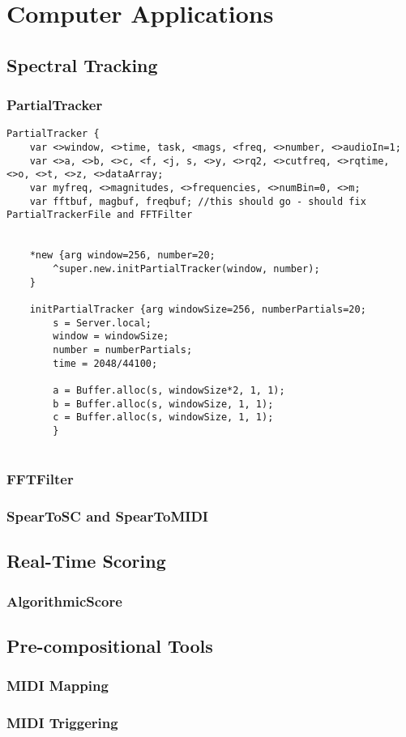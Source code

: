 \chapter{Computer Applications}

\section{Spectral Tracking}
\subsection{PartialTracker}

\begin{verbatim}
PartialTracker {
	var <>window, <>time, task, <mags, <freq, <>number, <>audioIn=1;
	var <>a, <>b, <>c, <f, <j, s, <>y, <>rq2, <>cutfreq, <>rqtime, <>o, <>t, <>z, <>dataArray;
	var myfreq, <>magnitudes, <>frequencies, <>numBin=0, <>m;
	var fftbuf, magbuf, freqbuf; //this should go - should fix PartialTrackerFile and FFTFilter

	
	*new {arg window=256, number=20;
		^super.new.initPartialTracker(window, number);
	}
	
	initPartialTracker {arg windowSize=256, numberPartials=20;
		s = Server.local;
		window = windowSize;
		number = numberPartials;
		time = 2048/44100;
		
		a = Buffer.alloc(s, windowSize*2, 1, 1);
		b = Buffer.alloc(s, windowSize, 1, 1);
		c = Buffer.alloc(s, windowSize, 1, 1);
		}
			
\end{verbatim}

\subsection{FFTFilter}
\subsection{SpearToSC and SpearToMIDI}

\section{Real-Time Scoring}
\subsection{AlgorithmicScore}

\section{Pre-compositional Tools}
\subsection{MIDI Mapping}
\subsection{MIDI Triggering}

\label{ch:compamp}